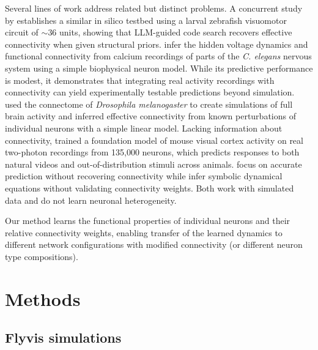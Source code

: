 \documentclass{article}
\begin{document}
Several lines of work address related but distinct
problems.
A concurrent study by \citet{Lueckmann2026-hl} establishes a similar in silico testbed using a larval zebrafish visuomotor circuit of $\sim$36 units, showing that LLM-guided code search recovers effective connectivity when given structural priors. 
\citet{mi_connectome-constrained_2021} infer the hidden voltage dynamics and functional connectivity from calcium recordings of parts of the \emph{C. elegans} nervous system using a simple biophysical neuron model.  While its predictive performance is modest, it demonstrates that integrating real activity recordings with connectivity can yield experimentally testable predictions beyond simulation.  \citet{pospisil_fly_2024} used the connectome of \emph{Drosophila melanogaster} \citep{dorkenwald_neuronal_2024} to create simulations of full brain activity and inferred effective connectivity from known perturbations of individual neurons with a simple linear model.  Lacking information about connectivity, \citet{wang_foundation_2025} trained a foundation model of mouse visual cortex activity on real two-photon recordings from 135,000 neurons, which predicts responses to both natural videos and out-of-distribution stimuli across animals.
\citet{prasse_predicting_2022} focus on accurate prediction without recovering connectivity while \citet{yu_discovering_2025} infer symbolic dynamical equations without validating connectivity weights. Both work with simulated data and do not learn neuronal heterogeneity.

Our method learns the functional properties of individual neurons and their relative connectivity weights, enabling transfer of the learned dynamics to different network configurations with modified connectivity (or different neuron type compositions).

\section{Methods}

\subsection*{Flyvis simulations} \label{method:simulation}
\end{document}
